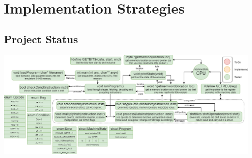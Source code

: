 \documentclass[11pt]{article}
\begin{document}
\section{Implementation Strategies}
    \subsection*{Project Status}
        \begin{center}
            \includegraphics[scale = 0.4]{project status}
        \end{center}
    
\end{document}
